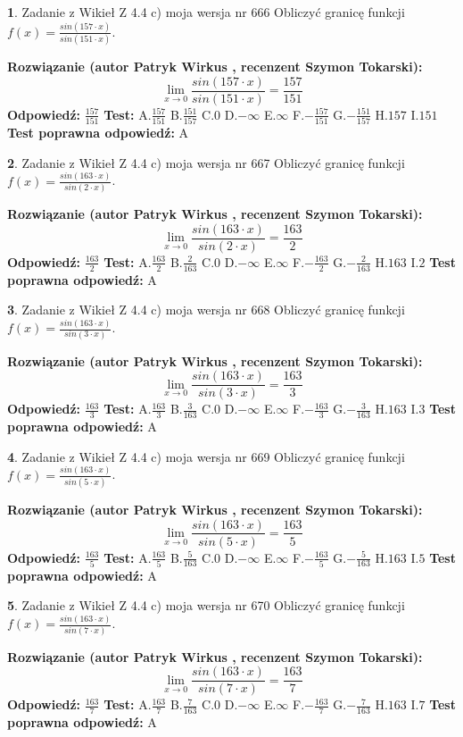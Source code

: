 \documentclass[12pt, a4paper]{article}
\theoremstyle{definition} %
\newtheorem{zad}{}
\newcommand{\zadStart}[1]{\begin{zad}#1\newline}
\newcommand{\zadStop}{\end{zad}}
\newcommand{\rozwStart}[2]{\noindent \textbf{Rozwiązanie (autor #1 , recenzent #2): }\newline}
\newcommand{\rozwStop}{\newline}
\newcommand{\odpStart}{\noindent \textbf{Odpowiedź:}\newline}
\newcommand{\odpStop}{\newline}
\newcommand{\testStart}{\noindent \textbf{Test:}\newline}
\newcommand{\testStop}{\newline}
\newcommand{\kluczStart}{\noindent \textbf{Test poprawna odpowiedź:}\newline}
\newcommand{\kluczStop}{\newline}
\begin{document}
\zadStart{Zadanie z Wikieł Z 4.4 c) moja wersja nr 666}
Obliczyć granicę funkcji $f(x)=\frac{sin(157\cdot x)}{sin(151\cdot x)}$.
\zadStop
\rozwStart{Patryk Wirkus}{Szymon Tokarski}
$$\lim\limits_{x\to 0}\frac{sin(157\cdot x)}{sin(151\cdot x)}=
\frac{157}{151}$$
\rozwStop
\odpStart
$\frac{157}{151}$
\odpStop
\testStart
A.$\frac{157}{151}$
B.$\frac{151}{157}$
C.$0$
D.$-\infty$
E.$\infty$
F.$-\frac{157}{151}$
G.$-\frac{151}{157}$
H.$157$
I.$151$
\testStop
\kluczStart
A
\kluczStop



\zadStart{Zadanie z Wikieł Z 4.4 c) moja wersja nr 667}
Obliczyć granicę funkcji $f(x)=\frac{sin(163\cdot x)}{sin(2\cdot x)}$.
\zadStop
\rozwStart{Patryk Wirkus}{Szymon Tokarski}
$$\lim\limits_{x\to 0}\frac{sin(163\cdot x)}{sin(2\cdot x)}=
\frac{163}{2}$$
\rozwStop
\odpStart
$\frac{163}{2}$
\odpStop
\testStart
A.$\frac{163}{2}$
B.$\frac{2}{163}$
C.$0$
D.$-\infty$
E.$\infty$
F.$-\frac{163}{2}$
G.$-\frac{2}{163}$
H.$163$
I.$2$
\testStop
\kluczStart
A
\kluczStop



\zadStart{Zadanie z Wikieł Z 4.4 c) moja wersja nr 668}
Obliczyć granicę funkcji $f(x)=\frac{sin(163\cdot x)}{sin(3\cdot x)}$.
\zadStop
\rozwStart{Patryk Wirkus}{Szymon Tokarski}
$$\lim\limits_{x\to 0}\frac{sin(163\cdot x)}{sin(3\cdot x)}=
\frac{163}{3}$$
\rozwStop
\odpStart
$\frac{163}{3}$
\odpStop
\testStart
A.$\frac{163}{3}$
B.$\frac{3}{163}$
C.$0$
D.$-\infty$
E.$\infty$
F.$-\frac{163}{3}$
G.$-\frac{3}{163}$
H.$163$
I.$3$
\testStop
\kluczStart
A
\kluczStop



\zadStart{Zadanie z Wikieł Z 4.4 c) moja wersja nr 669}
Obliczyć granicę funkcji $f(x)=\frac{sin(163\cdot x)}{sin(5\cdot x)}$.
\zadStop
\rozwStart{Patryk Wirkus}{Szymon Tokarski}
$$\lim\limits_{x\to 0}\frac{sin(163\cdot x)}{sin(5\cdot x)}=
\frac{163}{5}$$
\rozwStop
\odpStart
$\frac{163}{5}$
\odpStop
\testStart
A.$\frac{163}{5}$
B.$\frac{5}{163}$
C.$0$
D.$-\infty$
E.$\infty$
F.$-\frac{163}{5}$
G.$-\frac{5}{163}$
H.$163$
I.$5$
\testStop
\kluczStart
A
\kluczStop



\zadStart{Zadanie z Wikieł Z 4.4 c) moja wersja nr 670}
Obliczyć granicę funkcji $f(x)=\frac{sin(163\cdot x)}{sin(7\cdot x)}$.
\zadStop
\rozwStart{Patryk Wirkus}{Szymon Tokarski}
$$\lim\limits_{x\to 0}\frac{sin(163\cdot x)}{sin(7\cdot x)}=
\frac{163}{7}$$
\rozwStop
\odpStart
$\frac{163}{7}$
\odpStop
\testStart
A.$\frac{163}{7}$
B.$\frac{7}{163}$
C.$0$
D.$-\infty$
E.$\infty$
F.$-\frac{163}{7}$
G.$-\frac{7}{163}$
H.$163$
I.$7$
\testStop
\kluczStart
A
\kluczStop
\end{document}
